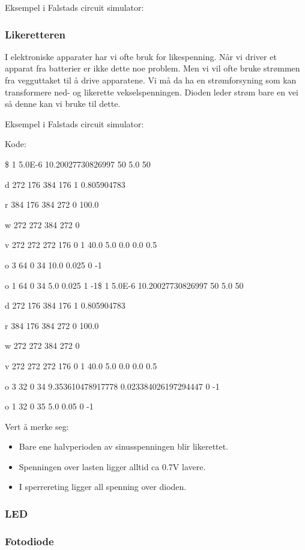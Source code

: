 \documentclass[12pt,a4paper]{article}
\begin{document}
Eksempel i Falstads circuit simulator:

\subsubsection{Likeretteren}

I elektroniske apparater har vi ofte bruk for likespenning. Når vi
driver et apparat fra batterier er ikke dette noe problem. Men vi
vil ofte bruke strømmen fra vegguttaket til å drive apparatene. Vi
må da ha en strømforsyning som kan transformere ned- og likerette
vekselspenningen. Dioden leder strøm bare en vei så denne kan vi bruke
til dette. 

Eksempel i Falstads circuit simulator:

Kode:

\$ 1 5.0E-6 10.20027730826997 50 5.0 50

d 272 176 384 176 1 0.805904783

r 384 176 384 272 0 100.0

w 272 272 384 272 0

v 272 272 272 176 0 1 40.0 5.0 0.0 0.0 0.5

o 3 64 0 34 10.0 0.025 0 -1

o 1 64 0 34 5.0 0.025 1 -1\$ 1 5.0E-6 10.20027730826997 50 5.0 50

d 272 176 384 176 1 0.805904783

r 384 176 384 272 0 100.0

w 272 272 384 272 0

v 272 272 272 176 0 1 40.0 5.0 0.0 0.0 0.5

o 3 32 0 34 9.353610478917778 0.023384026197294447 0 -1

o 1 32 0 35 5.0 0.05 0 -1

Vert å merke seg:
\begin{itemize}
\item Bare ene halvperioden av sinusspenningen blir likerettet. 
\item Spenningen over lasten ligger alltid ca 0.7V lavere. 
\item I sperrereting ligger all spenning over dioden. 
\end{itemize}

\subsubsection{LED}

\subsubsection{Fotodiode}
\end{document}
